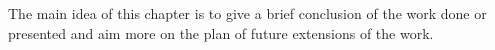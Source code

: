 The main idea of this chapter is to give a brief conclusion of the work done or 
presented and aim more on the plan of future extensions of the work. 
